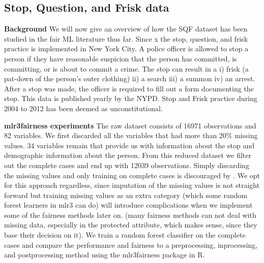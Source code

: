 \subsection*{Stop, Question, and Frisk data}
\textbf{Background}
We will now give an overview of how the SQF dataset has been studied in the fair ML literature thus far.
Since x the stop, question, and frisk practice is implemented in New York City. A police officer is allowed to stop a person if they have reasonable suspicion that the person has committed, is committing, or is about to commit a crime.
The stop can result in a i) frisk (a pat-down of the person's outer clothing)
ii) a search iii) a summon iv) an arrest. After a stop was made, the officer is required to fill out a form
documenting the stop. This data is published yearly by the NYPD. Stop and Frisk practice during 2004 to 2012 has been deemed as unconstitutional.

\textbf{mlr3fairness experiments}
The raw dataset consists of 16971 observations and 82 variables. We first discarded all the variables that had more than 20\% missing values.
34 variables remain that provide us with information about the stop and demographic information about the person. From this reduced dataset we filter out the complete cases and end up with 12039 observations.
Simply discarding the missing values and only training on complete cases is discouraged by \cite{fernando2021}. We opt for this approach regardless, since imputation of the missing values is not straight forward
but training missing values as an extra category (which some random forest learners in mlr3 can do) will introduce complications when we implement some of the fairness methods later on.
(many fairness methods can not deal with missing data, especially in the protected attribute, which makes sense, since they base their decision on it). 
We train a random forest classifier on the complete cases and compare the performance and fairness to a preprocessing, inprocessing, and postprocessing method using the mlr3fairness package in R.

